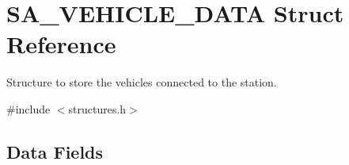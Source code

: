 \hypertarget{struct_s_a___v_e_h_i_c_l_e___d_a_t_a}{}\section{S\+A\+\_\+\+V\+E\+H\+I\+C\+L\+E\+\_\+\+D\+A\+TA Struct Reference}
\label{struct_s_a___v_e_h_i_c_l_e___d_a_t_a}


Structure to store the vehicles connected to the station.  




{\ttfamily \#include $<$structures.\+h$>$}

\subsection*{Data Fields}
